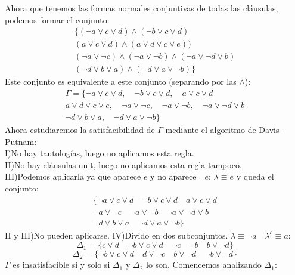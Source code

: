 \documentclass[a4paper]{article}
\theoremstyle{plain} \newtheorem{PrimerPrincipio}{Teorema}
\theoremstyle{plain} \newtheorem{SegundoPrincipio}{Teorema}
\begin{document}
Ahora que tenemos las formas normales conjuntivas de todas las cláusulas, podemos formar el conjunto:
\begin{equation*}
\begin{split}
\{(\neg a\lor c\lor d) \land (\neg b\lor c \lor d)\\(a\lor c\lor d)\land(a\lor d\lor c\lor e))\\ (\neg a\lor\neg c)\land(\neg a\lor \neg b)\land(\neg a\lor\neg d\lor b)\\ (\neg d\lor b\lor a)\land(\neg d\lor a\lor\neg b)\}
\end{split}
\end{equation*}
Este conjunto es equivalente a este conjunto (separando por las $\land$):
\begin{equation*}
\begin{split}
\Gamma=\{\neg a\lor c\lor d, \quad \neg b\lor c \lor d,\quad a\lor c\lor d\\a\lor d\lor c\lor e,\quad \neg a\lor\neg c,\quad\neg a\lor \neg b,\quad\neg a\lor\neg d\lor b\\ \neg d\lor b\lor a,\quad \neg d\lor a\lor\neg b \}
\end{split}
\end{equation*}
Ahora estudiaremos la satisfacibilidad de  $\Gamma$ mediante el algoritmo de Davis-Putnam:\\
I)No hay tautologías, luego no aplicamos esta regla.\\
II)No hay cláusulas unit, luego no aplicamos esta regla tampoco.\\
III)Podemos aplicarla ya que aparece $e$ y no aparece $\neg e$: $\lambda\equiv e$ y queda el conjunto:
\begin{equation}
\begin{split}
\{\neg a\lor c\lor d \quad \neg b\lor c \lor d\quad a\lor c\lor d\\ \neg a\lor\neg c\quad\neg a\lor \neg b\quad\neg a\lor\neg d\lor b\\ \neg d\lor b\lor a\quad \neg d\lor a\lor\neg b \}
\end{split}
\end{equation}
II y III)No pueden aplicarse.
IV)Divido en dos subconjuntos. $\lambda\equiv\neg a \quad \lambda^c\equiv a$:
$$\Delta_1=\{c\lor d\quad \neg b\lor c\lor d\quad\neg c\quad\neg b\quad b\lor\neg d\}$$
$$\Delta_2=\{\neg b\lor c\lor d\quad d\lor\neg c\quad b\lor\neg d\quad\neg b\lor\neg d\}$$
$\Gamma$ es insatisfacible si y solo si $\Delta_1$ y $\Delta_2$ lo son. Comencemos analizando $\Delta_1$:\\
\end{document}
